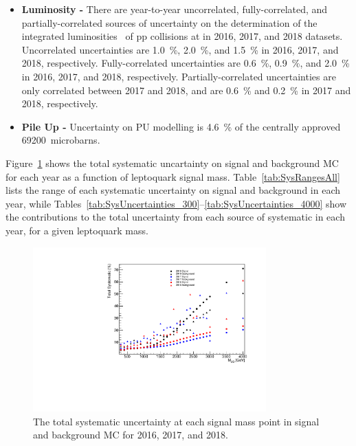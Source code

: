 \begin{itemize}
\item \textbf{Luminosity - }
There are year-to-year uncorrelated, fully-correlated, and partially-correlated sources of uncertainty on the determination of the integrated luminosities~\cite{CMS:LUM-17-003}\cite{CMS:LUM-17-004}\cite{CMS:LUM-18-002} of pp collisions at  in 2016, 2017, and 2018 datasets. Uncorrelated uncertainties are \SI{1.0}{\%}, \SI{2.0}{\%}, and \SI{1.5}{\%} in 2016, 2017, and 2018, respectively. Fully-correlated uncertainties are \SI{0.6}{\%}, \SI{0.9}{\%}, and \SI{2.0}{\%} in 2016, 2017, and 2018, respectively. Partially-correlated uncertainties are only correlated between 2017 and 2018, and are \SI{0.6}{\%} and \SI{0.2}{\%} in 2017 and 2018, respectively.

\item \textbf{Pile Up - }
Uncertainty on PU modelling is \SI{4.6}{\%} of the centrally approved 69200~microbarns. 
\end{itemize}

Figure~\ref{fig:totalSyst} shows the total systematic uncartainty on signal and background MC for each year as a function of leptoquark signal mass. Table~\ref{tab:SysRangesAll} lists the range of each systematic uncertainty on signal and background in each year, while Tables~\ref{tab:SysUncertainties_300}--\ref{tab:SysUncertainties_4000} show the contributions to the total uncertainty from each source of systematic in each year, for a given leptoquark mass.

\begin{figure}[H]
    \centering
    \includegraphics[width=0.8\textwidth]{Images/Analysis/TotalSysVsLQMass.pdf}
    \caption{The total systematic uncertainty at each signal mass point in signal and background MC for 2016, 2017, and 2018.}
    \label{fig:totalSyst}
\end{figure}


